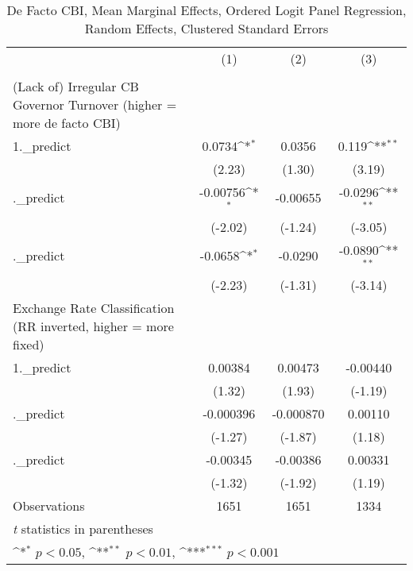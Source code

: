 \begin{table}[htbp]\centering
\def\sym#1{\ifmmode^{#1}\else\(^{#1}\)\fi}
\caption{De Facto CBI, Mean Marginal Effects, Ordered Logit Panel Regression, Random Effects, Clustered Standard Errors \label{ordLogDF}}
\begin{tabular}{l*{3}{c}}
\toprule
                                        &\multicolumn{1}{c}{(1)}&\multicolumn{1}{c}{(2)}&\multicolumn{1}{c}{(3)}\\
                                        &\multicolumn{1}{c}{}&\multicolumn{1}{c}{}&\multicolumn{1}{c}{}\\
\midrule
(Lack of) Irregular CB Governor Turnover (higher = more de facto CBI)&                  &                  &                  \\
1.\_predict                              &   0.0734\sym{*}  &   0.0356         &    0.119\sym{**} \\
                                        &   (2.23)         &   (1.30)         &   (3.19)         \\
\addlinespace
2.\_predict                              & -0.00756\sym{*}  & -0.00655         &  -0.0296\sym{**} \\
                                        &  (-2.02)         &  (-1.24)         &  (-3.05)         \\
\addlinespace
3.\_predict                              &  -0.0658\sym{*}  &  -0.0290         &  -0.0890\sym{**} \\
                                        &  (-2.23)         &  (-1.31)         &  (-3.14)         \\
\midrule
Exchange Rate Classification (RR inverted, higher = more fixed)&                  &                  &                  \\
1.\_predict                              &  0.00384         &  0.00473         & -0.00440         \\
                                        &   (1.32)         &   (1.93)         &  (-1.19)         \\
\addlinespace
2.\_predict                              &-0.000396         &-0.000870         &  0.00110         \\
                                        &  (-1.27)         &  (-1.87)         &   (1.18)         \\
\addlinespace
3.\_predict                              & -0.00345         & -0.00386         &  0.00331         \\
                                        &  (-1.32)         &  (-1.92)         &   (1.19)         \\
\midrule
Observations                            &     1651         &     1651         &     1334         \\
\bottomrule
\multicolumn{4}{l}{\footnotesize \textit{t} statistics in parentheses}\\
\multicolumn{4}{l}{\footnotesize \sym{*} \(p<0.05\), \sym{**} \(p<0.01\), \sym{***} \(p<0.001\)}\\
\end{tabular}
\end{table}
